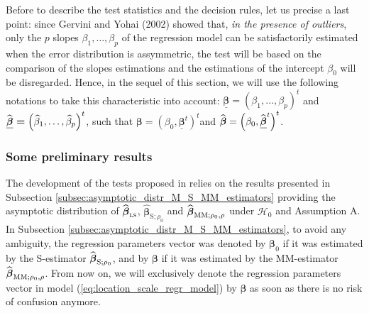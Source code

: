 Before to describe the test statistics and the decision rules, let us precise
a last point: since Gervini and Yohai (2002) showed that, \emph{in the
presence of outliers}, only the $p$ slopes $\beta_{1},\ldots,\beta_{p}$ of the
regression model can be satisfactorily estimated when the error distribution
is assymmetric, the test will be based on the comparison of the slopes
estimations and the estimations of the intercept $\beta_{0}$ will be
disregarded. Hence, in the sequel of this section, we will use the following
notations to take this characteristic into account: $\boldsymbol{\underline
{\boldsymbol\beta}=}\left(  \beta_{1},\ldots,\beta_{p}\right)  ^{t}$ and
$\boldsymbol{\underline{\sthat{\boldsymbol\beta}}=}\left(  \sthat{\beta
}_{1},\ldots,\sthat{\beta}_{p}\right)  ^{t}$, such that $\boldsymbol{\beta
}=\left(  \beta_{0},\boldsymbol{\underline{\boldsymbol\beta}}^{t}\right)
^{t}$and $\sthat{\boldsymbol\beta}=\left(  \beta_{0}%
,\boldsymbol{\underline{\sthat{\boldsymbol\beta}}}^{t}\right)  ^{t}$.

\subsubsection{Some preliminary results}

The development of the tests proposed in \citet{Dehon:2012}
relies on the results presented in Subsection
\ref{subsec:asymptotic_distr_M_S_MM_estimators} providing the asymptotic
distribution of $\sthat{\boldsymbol\beta}_{\stsc{LS}}$, $\widehat
{\boldsymbol\beta}_{\mathrm{S};\rho_{0}}$ and $\sthat{\boldsymbol\beta%
}_{\mathrm{MM};\rho_{0},\rho}$ under $\mathcal{H}_{0}$ and Assumption A. In
Subsection \ref{subsec:asymptotic_distr_M_S_MM_estimators}, to avoid any
ambiguity, the regression parameters vector was denoted by $\boldsymbol{\beta
}_{0}$ if it was estimated by the S-estimator $\sthat{\boldsymbol\beta%
}_{\mathrm{S};\rho_{0}}$, and by $\boldsymbol\beta$ if it was estimated by
the MM-estimator $\widehat{\boldsymbol\beta}_{\mathrm{MM};\rho_{0},\rho}$.
From now on, we will exclusively denote the regression parameters vector in
model (\ref{eq:location_scale_regr_model}) by $\boldsymbol\beta$ as soon as
there is no risk of confusion anymore.

